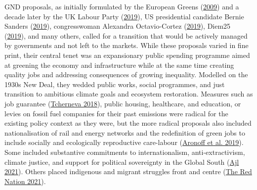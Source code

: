 \documentclass[a4paper, nobind]{templates/ociamthesis}
\begin{document}
GND proposals, as initially formulated by the European Greens (\protect\hyperlink{ref-european_greens_manifesto_2009}{2009}) and a decade later by the UK Labour Party (\protect\hyperlink{ref-the_labour_party_manifesto_2019}{2019}), US presidential candidate Bernie Sanders (\protect\hyperlink{ref-sanders_green_2019}{2019}), congresswoman Alexandra Octavio-Cortez (\protect\hyperlink{ref-ocasio-cortez_text_2019}{2019}), Diem25 (\protect\hyperlink{ref-diem25_green_2019}{2019}), and many others, called for a transition that would be actively managed by governments and not left to the markets. While these proposals varied in fine print, their central tenet was an expansionary public spending programme aimed at greening the economy and infrastructure while at the same time creating quality jobs and addressing consequences of growing inequality. Modelled on the 1930s New Deal, they wedded public works, social programmes, and just transition to ambitious climate goals and ecosystem restoration. Measures such as job guarantee (\protect\hyperlink{ref-tcherneva_job_2018}{Tcherneva 2018}), public housing, healthcare, and education, or levies on fossil fuel companies for their past emissions were radical for the existing policy context as they were, but the more radical proposals also included nationalisation of rail and energy networks and the redefinition of green jobs to include socially and ecologically reproductive care-labour (\protect\hyperlink{ref-aronoff_planet_2019}{Aronoff et al. 2019}). Some included substantive commitments to internationalism, anti-extractivism, climate justice, and support for political sovereignty in the Global South (\protect\hyperlink{ref-ajl_peoples_2021}{Ajl 2021}). Others placed indigenous and migrant struggles front and centre (\protect\hyperlink{ref-the_red_nation_red_2021}{The Red Nation 2021}).
\end{document}
